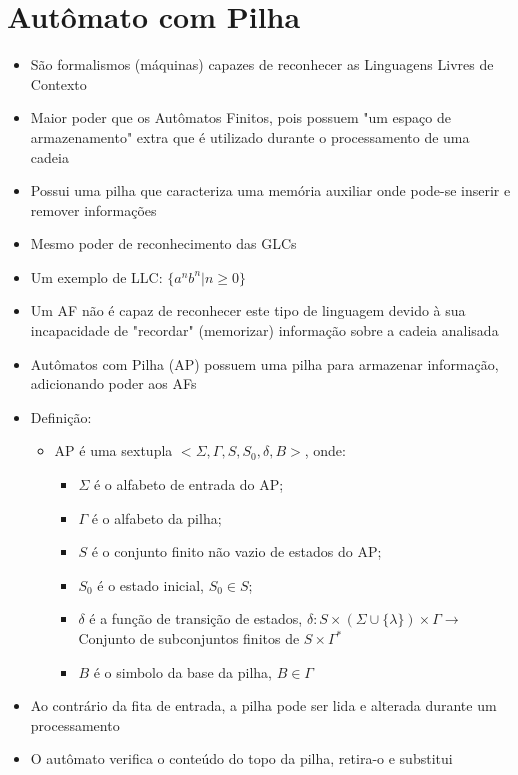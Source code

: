 \documentclass[12pt]{article}
\begin{document}
\section{Autômato com Pilha}
\begin{itemize}
    \item São formalismos (máquinas) capazes de reconhecer as Linguagens Livres 
    de Contexto
    \item Maior poder que os Autômatos Finitos, pois possuem "um espaço de 
    armazenamento" extra que é utilizado durante o processamento de uma cadeia
    \item Possui uma pilha que caracteriza uma memória auxiliar onde pode-se 
    inserir e remover informações
    \item Mesmo poder de reconhecimento das GLCs
    \item Um exemplo de LLC: $\{a^nb^n | n \geq 0\}$
    \item Um AF não é capaz de reconhecer este tipo de linguagem devido à sua 
    incapacidade de "recordar" (memorizar) informação sobre a cadeia analisada
    \item Autômatos com Pilha (AP) possuem uma pilha para armazenar informação, 
    adicionando poder aos AFs
    \item Definição:
    \begin{itemize}
        \item AP é uma sextupla $<\Sigma, \Gamma, S, S_0, \delta, B>$, onde:
        \begin{itemize}
            \item $\Sigma$ é o alfabeto de entrada do AP;
            \item $\Gamma$ é o alfabeto da pilha;
            \item $S$ é o conjunto finito não vazio de estados do AP;
            \item $S_0$ é o estado inicial, $S_0 \in S$;
            \item $\delta$ é a função de transição de estados, $\delta: S 
            \times (\Sigma \cup \{\lambda\}) \times \Gamma \rightarrow$ 
            Conjunto de subconjuntos finitos de $S \times \Gamma^*$
            \item $B$ é o simbolo da base da pilha, $B \in \Gamma$ 
        \end{itemize}
    \end{itemize}
    \item Ao contrário da fita de entrada, a pilha pode ser lida e alterada 
    durante um processamento
    \item O autômato verifica o conteúdo do topo da pilha, retira-o e substitui 

\end{itemize}
\end{document}
